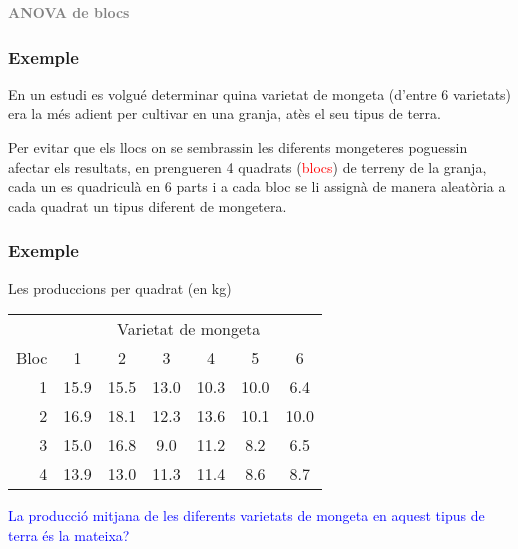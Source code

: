 \documentclass[12pt,t]{beamer}
\title[\red{Matemàtiques II}]{}
\author[]{}
\date{}
\newcommand{\red}[1]{\textcolor{red}{#1}}
\newcommand{\blue}[1]{\textcolor{blue}{#1}}
\newcommand{\gray}[1]{\textcolor{gray}{#1}}
\theoremstyle{plain}
\theoremstyle{definition}
\begin{document}
\beamertemplatedotitem


\begin{frame}
\vfill
\begin{center}
\gray{\LARGE\bf ANOVA de blocs}
\end{center}
\end{frame}


\begin{frame}
\frametitle{Exemple}

En un estudi es volgué determinar quina varietat de mongeta (d'entre 6 varietats) era la més adient per  cultivar en una granja, atès el seu tipus de terra. \medskip

Per evitar que els llocs on se sembrassin les diferents mongeteres poguessin afectar els resultats, en prengueren 4 quadrats (\red{blocs}) de terreny de la granja, cada un es quadriculà en 6 parts i a cada bloc se li assignà de manera aleatòria  a cada quadrat un tipus diferent de mongetera.

\end{frame}


\begin{frame}
\frametitle{Exemple}

Les produccions per quadrat (en kg)
\begin{center}
\begin{tabular}{r|cccccc}
\multicolumn{1}{c}{} &  \multicolumn{6}{c}{Varietat de mongeta}\\
Bloc & 1 & 2 & 3 & 4 & 5 & 6\\ \hline
1 &  15.9  &  15.5  &  13.0  &  10.3  &  10.0  &   6.4\\
2 &   16.9  &  18.1  &  12.3  &  13.6   & 10.1  &  10.0\\
3 &   15.0  &  16.8   &  9.0   & 11.2   &  8.2    & 6.5\\
4 &   13.9  &  13.0  &  11.3  &  11.4 &    8.6   &  8.7\\
\end{tabular}
\end{center}\medskip

\blue{La producció mitjana de les diferents varietats de mongeta en aquest tipus de terra és la mateixa?}
\end{frame}
\end{document}
